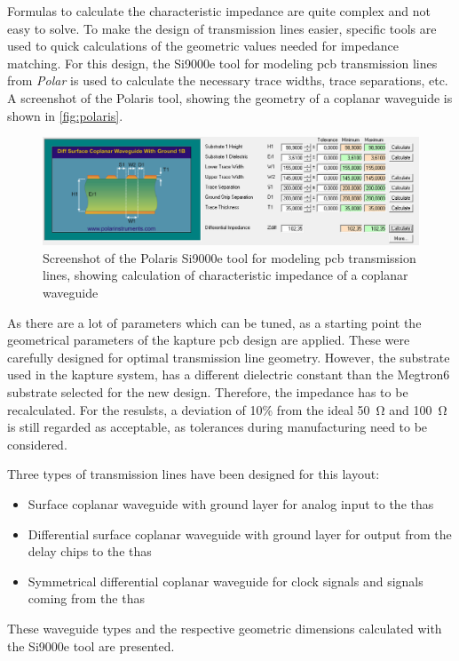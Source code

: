 Formulas to calculate the characteristic impedance are quite complex and not easy to solve.
To make the design of transmission lines easier, specific tools are used to quick calculations of the geometric values needed for impedance matching.
For this design, the Si9000e tool for modeling \gls{pcb} transmission lines from \textit{Polar} is used to calculate the necessary trace widths, trace separations, etc.
A screenshot of the Polaris tool, showing the geometry of a coplanar waveguide is shown in \autoref{fig:polaris}.
\begin{figure}[tb]
	\centering
	\includegraphics[width = \textwidth]{chap/04-theresa/img/polaris}
	\caption[Screenshot of the Polaris Si9000e]{Screenshot of the Polaris Si9000e tool for modeling \gls{pcb} transmission lines, showing calculation of characteristic impedance of a coplanar waveguide}
	\label{fig:polaris}
\end{figure}

As there are a lot of parameters which can be tuned, as a starting point the geometrical parameters of the \gls{kapture} \gls{pcb} design are applied. 
These were carefully designed for optimal transmission line geometry.
However, the substrate used in the \gls{kapture} system, has a different dielectric constant than the Megtron6 substrate selected for the new design. 
Therefore, the impedance has to be recalculated. 
For the resulsts, a deviation of 10\% from the ideal \SI{50}{\ohm} and \SI{100}{\ohm} is still regarded as acceptable, as tolerances during manufacturing need to be considered.

Three types of transmission lines have been designed for this layout:
\begin{itemize}
	\item Surface coplanar waveguide with ground layer for analog input to the \glspl{tha} 
	\item Differential surface coplanar waveguide with ground layer for output from the delay chips to the \glspl{tha}
	\item Symmetrical differential coplanar waveguide for clock signals and signals coming from the \glspl{tha}
\end{itemize}
These waveguide types and the respective geometric dimensions calculated with the Si9000e tool are presented.

